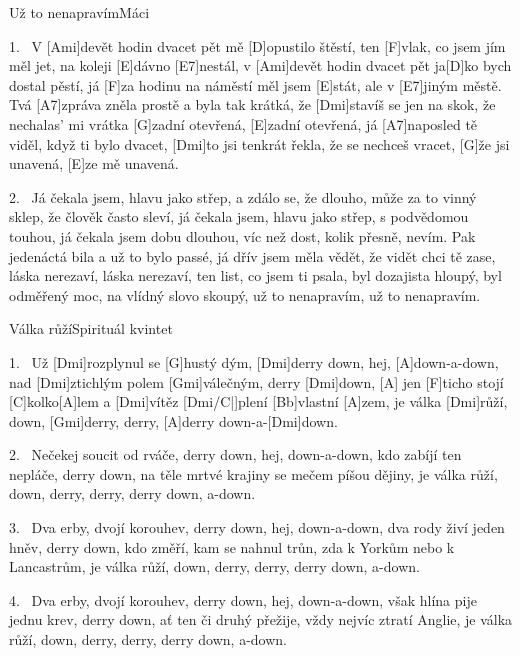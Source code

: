 \begin{song}{Už to nenapravím}{Máci}

\begin{xverse}{1.~}
V [Ami]devět hodin dvacet pět mě [D]opustilo štěstí,
ten [F]vlak, co jsem jím měl jet, na koleji [E]dávno [E7]nestál,
v [Ami]devět hodin dvacet pět ja[D]ko bych dostal pěstí,
já [F]za hodinu na náměstí měl jsem [E]stát, ale v [E7]jiným městě.
Tvá [A7]zpráva zněla prostě a byla tak krátká,
že [Dmi]stavíš se jen na skok, že nechalas' mi vrátka
[G]zadní otevřená, [E]zadní otevřená,
já [A7]naposled tě viděl, když ti bylo dvacet,
[Dmi]to jsi tenkrát řekla, že se nechceš vracet,
[G]{že} jsi unavená, [E]ze mě unavená.
\end{xverse}

\begin{xverse}{2.~}
Já čekala jsem, hlavu jako střep, a zdálo se, že dlouho,
může za to vinný sklep, že člověk často sleví,
já čekala jsem, hlavu jako střep, s podvědomou touhou,
já čekala jsem dobu dlouhou, víc než dost, kolik přesně, nevím.
Pak jedenáctá bila a už to bylo passé,
já dřív jsem měla vědět, že vidět chci tě zase,
láska nerezaví, láska nerezaví,
ten list, co jsem ti psala, byl dozajista hloupý,
byl odměřený moc, na vlídný slovo skoupý,
už to nenapravím, už to nenapravím.
\end{xverse}

\end{song}

\begin{song}{Válka růží}{Spirituál kvintet}

\begin{xverse}{1.~}
Už [Dmi]rozplynul se [G]hustý dým, [Dmi]derry down, hej, [A]down-a-down,
nad [Dmi]ztichlým polem [Gmi]válečným, derry [Dmi]down, [A]{}
jen [F]ticho stojí [C]kolko[A]lem a [Dmi]vítěz [Dmi/C|]{plení} [Bb]vlastní [A]zem,
je válka [Dmi]růží, down, [Gmi]derry, derry, [A]derry down-a-[Dmi]down.
\end{xverse}


\begin{xverse}{2.~}
Nečekej soucit od rváče, derry down, hej, down-a-down,
kdo zabíjí ten nepláče, derry down,
na těle mrtvé krajiny se mečem píšou dějiny,
je válka růží, down, derry, derry, derry down, a-down.
\end{xverse}


\begin{xverse}{3.~}
Dva erby, dvojí korouhev, derry down, hej, down-a-down,
dva rody živí jeden hněv, derry down,
kdo změří, kam se nahnul trůn, zda k Yorkům nebo k Lancastrům,
je válka růží, down, derry, derry, derry down, a-down.
\end{xverse}


\begin{xverse}{4.~}
Dva erby, dvojí korouhev, derry down, hej, down-a-down,
však hlína pije jednu krev, derry down,
ať ten či druhý přežije, vždy nejvíc ztratí Anglie,
je válka růží, down, derry, derry, derry down, a-down.
\end{xverse}

\end{song}
\chords{ \chordDmiC }

